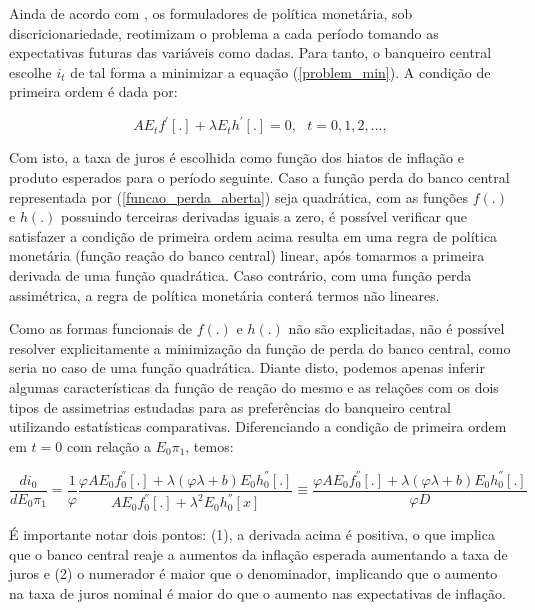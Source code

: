\documentclass[
	article,			%
	11pt,				%
	oneside,			%
	a4paper,			%
	english,			%
	brazil,				%
	]{abntex2}
\begin{document}
	Ainda de acordo com , os formuladores de política monetária, sob discricionariedade, reotimizam o problema a cada período tomando as expectativas futuras das variáveis como dadas. Para tanto, o banqueiro central escolhe $i_t$ de tal forma a minimizar a equação (\ref{problem_min}). A condição de primeira ordem é dada por:
	
	\begin{equation}
		AE_tf^'[.] + \lambda E_{t} h^' [.] = 0, \mbox{ } t = 0, 1, 2, ...,
	\end{equation}

	Com isto, a taxa de juros é escolhida como função dos hiatos de inflação e produto esperados para o período seguinte. Caso a função perda do banco central representada por (\ref{funcao_perda_aberta}) seja quadrática, com as funções $f(.)$ e $h(.)$ possuindo terceiras derivadas iguais a zero, é possível verificar que satisfazer a condição de primeira ordem acima resulta em uma regra de política monetária (função reação do banco central) linear, após tomarmos a primeira derivada de uma função quadrática. Caso contrário, com uma função perda assimétrica, a regra de política monetária conterá termos não lineares.
	
	Como as formas funcionais de $f(.)$ e $h(.)$ não são explicitadas, não é possível resolver explicitamente a minimização da função de perda do banco central, como seria no caso de uma função quadrática. Diante disto, podemos apenas inferir algumas características da função de reação do mesmo e as relações com os dois tipos de assimetrias estudadas para as preferências do banqueiro central utilizando estatísticas comparativas. Diferenciando a condição de primeira ordem em $t=0$ com relação a $E_0\pi_1$, temos:
	
	\begin{equation}
		\frac{di_0}{dE_0\pi_1} = \frac{1}{\varphi} \frac{\varphi A E_0 f_0^{''} [.] + \lambda(\varphi\lambda + b)E_0h_0^{''}[.]}{AE_0f_0^{''}[.] + \lambda^2E_0h_0^{''}[x]} \equiv \frac{\varphi A E_0 f_0^{''}[.] + \lambda(\varphi\lambda + b)E_0h_0^{''}[.]}{\varphi D}
	\end{equation}
	
	É importante notar dois pontos: (1), a derivada acima é positiva, o que implica que o banco central reaje a aumentos da inflação esperada aumentando a taxa de juros e (2) o numerador é maior que o denominador, implicando que o aumento na taxa de juros nominal é maior do que o aumento nas expectativas de inflação.
	
\end{document}
